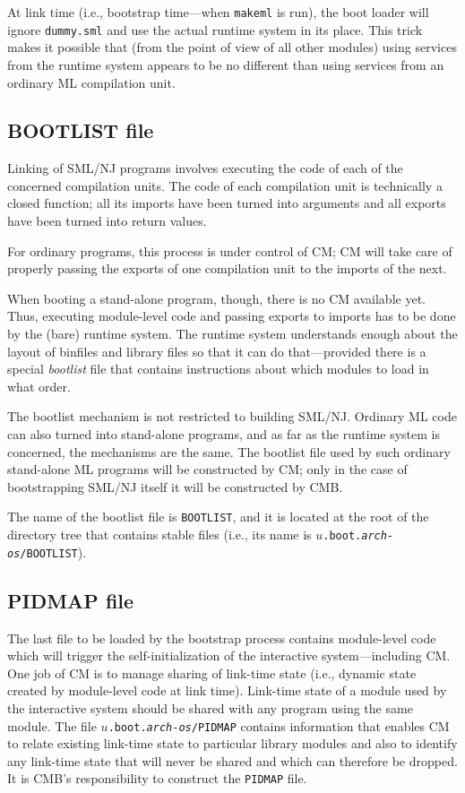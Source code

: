 At link time (i.e., bootstrap time---when {\tt makeml} is run), the
boot loader will ignore {\tt dummy.sml} and use the actual runtime
system in its place.  This trick makes it possible that (from the
point of view of all other modules) using services from the runtime
system appears to be no different than using services from an ordinary
ML compilation unit.

\subsection{BOOTLIST file}

Linking of SML/NJ programs involves executing the code of each of the
concerned compilation units.  The code of each compilation unit is
technically a closed function; all its imports have been turned into
arguments and all exports have been turned into return values.

For ordinary programs, this process is under control of CM; CM will
take care of properly passing the exports of one compilation unit to
the imports of the next.

When booting a stand-alone program, though, there is no CM available
yet.  Thus, executing module-level code and passing exports to imports
has to be done by the (bare) runtime system.  The runtime system
understands enough about the layout of binfiles and library files so
that it can do that---provided there is a special {\em bootlist}
file that contains instructions about which modules to load in what
order.

The bootlist mechanism is not restricted to building SML/NJ.  Ordinary
ML code can also turned into stand-alone programs, and as far as the
runtime system is concerned, the mechanisms are the same.  The
bootlist file used by such ordinary stand-alone ML programs will be
constructed by CM; only in the case of bootstrapping SML/NJ itself it
will be constructed by CMB.

The name of the bootlist file is {\tt BOOTLIST}, and it is located at
the root of the directory tree that contains stable files (i.e., its
name is {\tt $u$.boot.{\it arch}-{\it os}/BOOTLIST}).

\subsection{PIDMAP file}

The last file to be loaded by the bootstrap process contains
module-level code which will trigger the self-initialization of the
interactive system---including CM.  One job of CM is to manage sharing
of link-time state (i.e., dynamic state created by module-level code
at link time).  Link-time state of a module used by the interactive
system should be shared with any program using the same module.  The
file {\tt $u$.boot.{\it arch}-{\it os}/PIDMAP} contains information
that enables CM to relate existing link-time state to particular
library modules and also to identify any link-time state that will
never be shared and which can therefore be dropped.  It is CMB's
responsibility to construct the {\tt PIDMAP} file.

